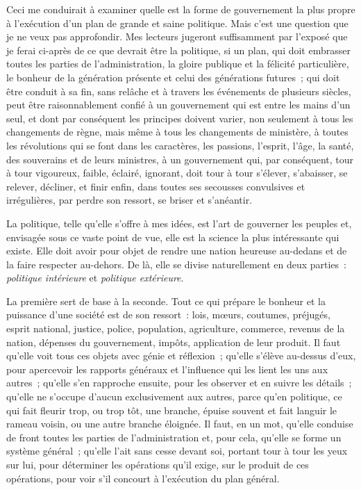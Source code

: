 \documentclass[french,twoside]{book} %
\begin{document}
Ceci me conduirait à examiner quelle est la forme de gouvernement la plus propre à l’exécution d’un plan de grande et saine politique. Mais c’est une question que je ne veux pas approfondir. Mes lecteurs jugeront suffisamment par l’exposé que je ferai ci-après de ce que devrait être la politique, si un plan, qui doit embrasser toutes les parties de l’administration, la gloire publique et la félicité particulière, le bonheur de la génération présente et celui des générations futures ; qui doit être conduit à sa fin, sans relâche et à travers les événements de plusieurs siècles, peut être raisonnablement confié à un gouvernement qui est entre les mains d’un seul, et dont par conséquent les principes doivent varier, non seulement à tous les changements de règne, mais même à tous les changements de ministère, à toutes les révolutions qui se font dans les caractères, les passions, l’esprit, l’âge, la santé, des souverains et de leurs ministres, à un gouvernement qui, par conséquent, tour à tour vigoureux, faible, éclairé, ignorant, doit tour à tour s’élever, s’abaisser, se relever, décliner, et finir enfin, dans toutes ses secousses convulsives et irrégulières, par perdre son ressort, se briser et s’anéantir.\par
La politique, telle qu’elle s’offre à mes idées, est l’art de gouverner les peuples et, envisagée sous ce vaste point de vue, elle est la science la plus intéressante qui existe. Elle doit avoir pour objet de rendre une nation heureuse au-dedans et de la faire respecter au-dehors. De là, elle se divise naturellement en deux parties : {\itshape politique intérieure} et {\itshape politique extérieure}.\par
La première sert de base à la seconde. Tout ce qui prépare le bonheur et la puissance d’une société est de son ressort : lois, mœurs, coutumes, préjugés, esprit national, justice, police, population, agriculture, commerce, revenus de la nation, dépenses du gouvernement, impôts, application de leur produit. Il faut qu’elle voit tous ces objets avec génie et réflexion ; qu’elle s’élève au-dessus d’eux, pour apercevoir les rapports généraux et l’influence qui les lient les uns aux autres ; qu’elle s’en rapproche ensuite, pour les observer et en suivre les détails ; qu’elle ne s’occupe d’aucun exclusivement aux autres, parce qu’en politique, ce qui fait fleurir trop, ou trop tôt, une branche, épuise souvent et fait languir le rameau voisin, ou une autre branche éloignée. Il faut, en un mot, qu’elle conduise de front toutes les parties de l’administration et, pour cela, qu’elle se forme un système général ; qu’elle l’ait sans cesse devant soi, portant tour à tour les yeux sur lui, pour déterminer les opérations qu’il exige, sur le produit de ces opérations, pour voir s’il concourt à l’exécution du plan général.\par
\end{document}

